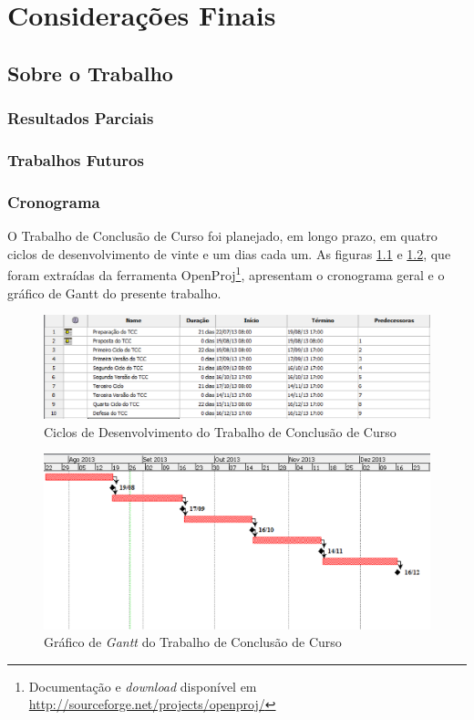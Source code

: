 \chapter{Considerações Finais}


\section{Sobre o Trabalho}

\subsection{Resultados Parciais}

\subsection{Trabalhos Futuros}


\subsection{Cronograma} 
O Trabalho de Conclusão de Curso foi planejado, em longo prazo, em quatro ciclos 
de desenvolvimento de vinte e um dias cada um. As figuras \ref{cronograma} e 
\ref{gantt}, que foram extraídas da ferramenta OpenProj\footnote{Documentação e 
\textit{download} disponível em 
\url{http://sourceforge.net/projects/openproj/}}, apresentam o cronograma geral 
e o gráfico de Gantt do presente trabalho.

\begin{figure}[h]
\centering
	\includegraphics[keepaspectratio=true,scale=0.7]{figuras/marcos.eps}
	\caption{Ciclos de Desenvolvimento do Trabalho de Conclusão de Curso}
	\label{cronograma}
\end{figure}


\begin{figure}[h]
\centering
	\includegraphics[keepaspectratio=true,scale=0.7]{figuras/gantt_chart.eps}
	\caption{Gráfico de \textit{Gantt} do Trabalho de Conclusão de Curso}
	\label{gantt}
\end{figure}

